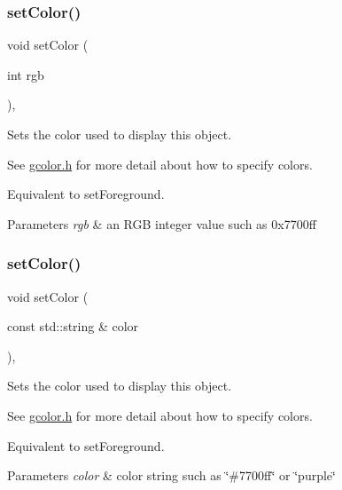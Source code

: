 \subsubsection{\texorpdfstring{set\+Color()}{setColor()}\hspace{0.1cm}{\footnotesize\ttfamily [2/3]}}
{\footnotesize\ttfamily void set\+Color (\begin{DoxyParamCaption}\item[{int}]{rgb }\end{DoxyParamCaption})\hspace{0.3cm}{\ttfamily [virtual]}, {\ttfamily [inherited]}}



Sets the color used to display this object. 

See \mbox{\hyperlink{gcolor_8h_source}{gcolor.\+h}} for more detail about how to specify colors.

Equivalent to set\+Foreground.


\begin{DoxyParams}{Parameters}
{\em rgb} & an R\+GB integer value such as 0x7700ff \\
\hline
\end{DoxyParams}
\mbox{\label{classsgl_1_1GObject_a61374df6c11b52cfbb0815decdbaebc6}} 
\subsubsection{\texorpdfstring{set\+Color()}{setColor()}\hspace{0.1cm}{\footnotesize\ttfamily [3/3]}}
{\footnotesize\ttfamily void set\+Color (\begin{DoxyParamCaption}\item[{const std\+::string \&}]{color }\end{DoxyParamCaption})\hspace{0.3cm}{\ttfamily [virtual]}, {\ttfamily [inherited]}}



Sets the color used to display this object. 

See \mbox{\hyperlink{gcolor_8h_source}{gcolor.\+h}} for more detail about how to specify colors.

Equivalent to set\+Foreground.


\begin{DoxyParams}{Parameters}
{\em color} & color string such as \char`\"{}\#7700ff\char`\"{} or \char`\"{}purple\char`\"{} \\
\hline
\end{DoxyParams}
\mbox{\label{classsgl_1_1GObject_ad767a33971159e9493e221cca4c00ae9}} 
